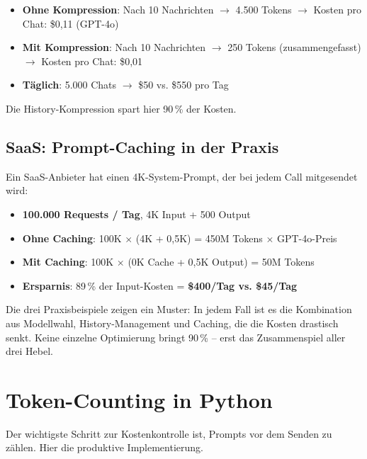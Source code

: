 \begin{itemize}[leftmargin=*]
    \item \textbf{Ohne Kompression}: Nach 10 Nachrichten $\rightarrow$ 4.500 Tokens $\rightarrow$ Kosten pro Chat: \$0,11 (GPT-4o)
    \item \textbf{Mit Kompression}: Nach 10 Nachrichten $\rightarrow$ 250 Tokens (zusammengefasst) $\rightarrow$ Kosten pro Chat: \$0,01
    \item \textbf{Täglich}: 5.000 Chats $\rightarrow$ \$50 vs. \$550 pro Tag
\end{itemize}

Die History-Kompression spart hier 90\,\% der Kosten.

\subsection{SaaS: Prompt-Caching in der Praxis}

Ein SaaS-Anbieter hat einen 4K-System-Prompt, der bei jedem Call mitgesendet wird:

\begin{itemize}[leftmargin=*]
    \item \textbf{100.000 Requests / Tag}, 4K Input + 500 Output
    \item \textbf{Ohne Caching}: 100K $\times$ (4K + 0,5K) = 450M Tokens $\times$ GPT-4o-Preis
    \item \textbf{Mit Caching}: 100K $\times$ (0K Cache + 0,5K Output) = 50M Tokens
    \item \textbf{Ersparnis}: 89\,\% der Input-Kosten = \textbf{\$400/Tag vs. \$45/Tag}
\end{itemize}

\begin{praxishinweis}
Die drei Praxisbeispiele zeigen ein Muster: In jedem Fall ist es die Kombination aus Modellwahl, History-Management und Caching, die die Kosten drastisch senkt. Keine einzelne Optimierung bringt 90\,\% -- erst das Zusammenspiel aller drei Hebel.
\end{praxishinweis}

\section{Token-Counting in Python}

Der wichtigste Schritt zur Kostenkontrolle ist, Prompts vor dem Senden zu zählen. Hier die produktive Implementierung.


